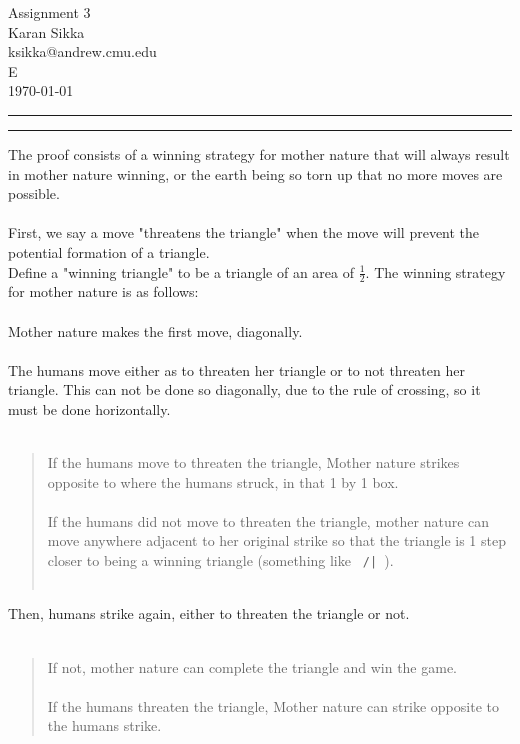 \documentclass[11pt]{article}
\makeatletter
\newcounter{questionCounter}
\newcounter{partCounter}[questionCounter]
\newenvironment{question}[2][\arabic{questionCounter}]{%
    \setcounter{partCounter}{0}%
    \vspace{.25in} \hrule \vspace{0.5em}%
        \noindent{\bf #2}%
    \vspace{0.8em} \hrule \vspace{.10in}%
    \addtocounter{questionCounter}{1}%
}{}
\newcommand{\myname}{Karan Sikka}
\newcommand{\myandrew}{ksikka@andrew.cmu.edu}
\newcommand{\myhwname}{Assignment 3}
\newcommand{\myrecitation}{E}
\makeatother
\begin{document}
\thispagestyle{plain}

\begin{center}
{\Large \myhwname} \\
\myname \\
\myandrew \\
\myrecitation \\
\today
\end{center}
\begin{question}{The World is Ending}
The proof consists of a winning strategy for mother nature that will always result in mother nature winning, or the earth being so torn up that no more moves are possible.\\
\\
First, we say a move "threatens the triangle" when the move will prevent the potential formation of a triangle.\\
Define a "winning triangle" to be a triangle of an area of $\frac{1}{2}.$
The winning strategy for mother nature is as follows:\\
\\
Mother nature makes the first move, diagonally.\\
\\
The humans move either as to threaten her triangle or to not threaten her triangle. This can not be done so diagonally, due to the rule of crossing, so it must be done horizontally.\\
\\
\begin{quote}
If the humans move to threaten the triangle, Mother nature strikes opposite to where the humans struck, in that 1 by 1 box.\\
\\
If the humans did not move to threaten the triangle, mother nature can move anywhere adjacent to her original strike so that the triangle is 1 step closer to being a winning triangle (something like \verb+ /| +).\\
\\
\end{quote}
Then, humans strike again, either to threaten the triangle or not.\\
\\
\begin{quote}
If not, mother nature can complete the triangle and win the game.\\
\\
If the humans threaten the triangle, Mother nature can strike opposite to the humans strike.\\

\end{quote}
\end{question}
\end{document}
